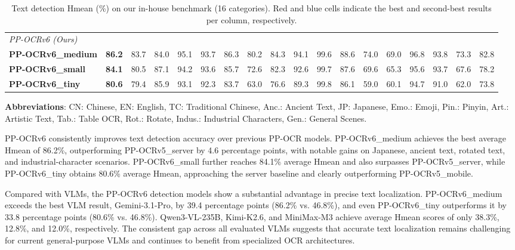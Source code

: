 \documentclass[11pt, a4paper,logo,  copyright, nonumbering]{paddleocr}
\begin{document}
\begin{table}[!htbp]
{\begin{tabular}{@{}l c *{16}{c} @{}}
\multicolumn{18}{l}{\textit{PP-OCRv6 (Ours)}} \\
\quad \textbf{PP-OCRv6\_medium} & \cellcolor{red!10}\textbf{86.2} & \cellcolor{red!10}83.7 & 84.0 & \cellcolor{red!10}95.1 & \cellcolor{red!10}93.7 & \cellcolor{red!10}86.3 & \cellcolor{red!10}80.2 & \cellcolor{red!10}84.3 & \cellcolor{red!10}94.1 & 99.6 & \cellcolor{red!10}88.6 & \cellcolor{red!10}74.0 & \cellcolor{red!10}69.0 & \cellcolor{cyan!10}96.8 & \cellcolor{red!10}93.8 & \cellcolor{red!10}73.3 & \cellcolor{red!10}82.8 \\
\quad \textbf{PP-OCRv6\_small} & \cellcolor{cyan!10}\textbf{84.1} & \cellcolor{cyan!10}80.5 & \cellcolor{red!10}87.1 & 94.2 & \cellcolor{cyan!10}93.6 & \cellcolor{cyan!10}85.7 & \cellcolor{cyan!10}72.6 & \cellcolor{cyan!10}82.3 & \cellcolor{cyan!10}92.6 & \cellcolor{cyan!10}99.7 & \cellcolor{cyan!10}87.6 & \cellcolor{cyan!10}69.6 & 65.3 & 95.6 & \cellcolor{cyan!10}93.7 & \cellcolor{cyan!10}67.6 & 78.2 \\
\quad \textbf{PP-OCRv6\_tiny} & \textbf{80.6} & 79.4 & \cellcolor{cyan!10}85.9 & 93.1 & 92.3 & 83.7 & 63.0 & 76.6 & 89.3 & \cellcolor{red!10}99.8 & 86.1 & 59.0 & 60.1 & 94.7 & 91.0 & 62.0 & 73.8 \\
\bottomrule
\end{tabular}
}

\caption{Text detection Hmean (\%) on our in-house benchmark (16 categories). \colorbox{red!10}{Red} and \colorbox{cyan!10}{blue} cells indicate the best and second-best results per column, respectively.}
\label{tab:det_main}

\vspace{4pt}
\footnotesize
\textbf{Abbreviations}: CN: Chinese, EN: English, TC: Traditional Chinese, Anc.: Ancient Text, JP: Japanese, Emo.: Emoji, Pin.: Pinyin, Art.: Artistic Text, Tab.: Table OCR, Rot.: Rotate, Indus.: Industrial Characters, Gen.: General Scenes.
\end{table}

PP-OCRv6 consistently improves text detection accuracy over previous PP-OCR models. PP-OCRv6\_medium achieves the best average Hmean of 86.2\%, outperforming PP-OCRv5\_server by 4.6 percentage points, with notable gains on Japanese, ancient text, rotated text, and industrial-character scenarios. PP-OCRv6\_small further reaches 84.1\% average Hmean and also surpasses PP-OCRv5\_server, while PP-OCRv6\_tiny obtains 80.6\% average Hmean, approaching the server baseline and clearly outperforming PP-OCRv5\_mobile.

Compared with VLMs, the PP-OCRv6 detection models show a substantial advantage in precise text localization. PP-OCRv6\_medium exceeds the best VLM result, Gemini-3.1-Pro, by 39.4 percentage points (86.2\% vs. 46.8\%), and even PP-OCRv6\_tiny outperforms it by 33.8 percentage points (80.6\% vs. 46.8\%). Qwen3-VL-235B, Kimi-K2.6, and MiniMax-M3 achieve average Hmean scores of only 38.3\%, 12.8\%, and 12.0\%, respectively. The consistent gap across all evaluated VLMs suggests that accurate text localization remains challenging for current general-purpose VLMs and continues to benefit from specialized OCR architectures.
\end{document}
